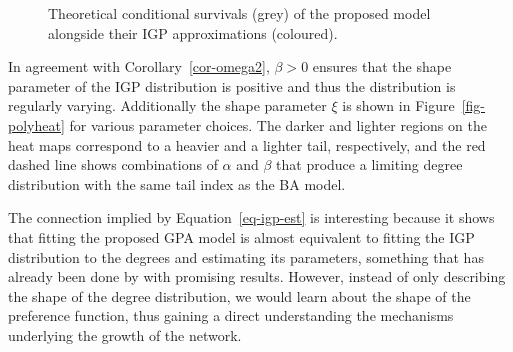 \documentclass[
  sn-basic,
  10pt,
]{sn-jnl}
\theoremstyle{plain}
\theoremstyle{plain}
\theoremstyle{remark}
\begin{document}
\begin{figure}


\caption{\label{fig-approx_surv}Theoretical conditional survivals (grey)
of the proposed model alongside their IGP approximations (coloured).}

\end{figure}%

In agreement with Corollary~\ref{cor-omega2}, \(\beta>0\) ensures that
the shape parameter of the IGP distribution is positive and thus the
distribution is regularly varying. Additionally the shape parameter
\(\xi\) is shown in Figure~\ref{fig-polyheat} for various parameter
choices. The darker and lighter regions on the heat maps correspond to a
heavier and a lighter tail, respectively, and the red dashed line shows
combinations of \(\alpha\) and \(\beta\) that produce a limiting degree
distribution with the same tail index as the BA model.

The connection implied by Equation~\ref{eq-igp-est} is interesting
because it shows that fitting the proposed GPA model is almost
equivalent to fitting the IGP distribution to the degrees and estimating
its parameters, something that has already been done by \citet{Lee24}
with promising results. However, instead of only describing the shape of
the degree distribution, we would learn about the shape of the
preference function, thus gaining a direct understanding the mechanisms
underlying the growth of the network.
\end{document}
